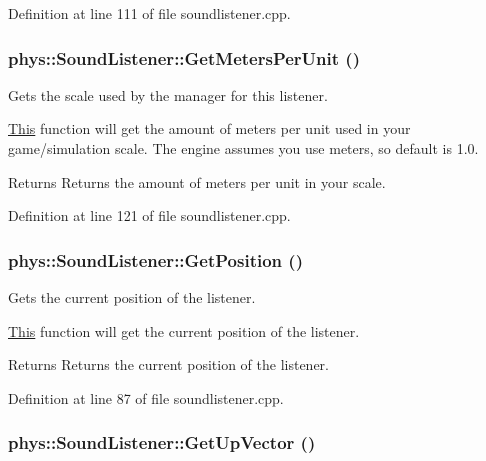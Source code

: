 Definition at line 111 of file soundlistener.cpp.

\hypertarget{classphys_1_1SoundListener_a97c834a1b8fec9ce3a0e705468d531e5}{
\subsubsection[{GetMetersPerUnit}]{ phys::SoundListener::GetMetersPerUnit ()}}
\label{d1/d5a/classphys_1_1SoundListener_a97c834a1b8fec9ce3a0e705468d531e5}


Gets the scale used by the manager for this listener. 

\hyperlink{structThis}{This} function will get the amount of meters per unit used in your game/simulation scale. The engine assumes you use meters, so default is 1.0. \begin{DoxyReturn}{Returns}
Returns the amount of meters per unit in your scale. 
\end{DoxyReturn}


Definition at line 121 of file soundlistener.cpp.

\hypertarget{classphys_1_1SoundListener_ad0bec6f468f7bcfa3cadfafbd22a8603}{
\subsubsection[{GetPosition}]{ phys::SoundListener::GetPosition ()}}
\label{d1/d5a/classphys_1_1SoundListener_ad0bec6f468f7bcfa3cadfafbd22a8603}


Gets the current position of the listener. 

\hyperlink{structThis}{This} function will get the current position of the listener. \begin{DoxyReturn}{Returns}
Returns the current position of the listener. 
\end{DoxyReturn}


Definition at line 87 of file soundlistener.cpp.

\hypertarget{classphys_1_1SoundListener_aff27f90cad8b2eec53e28d28ee2203c3}{
\subsubsection[{GetUpVector}]{ phys::SoundListener::GetUpVector ()}}
\label{d1/d5a/classphys_1_1SoundListener_aff27f90cad8b2eec53e28d28ee2203c3}


